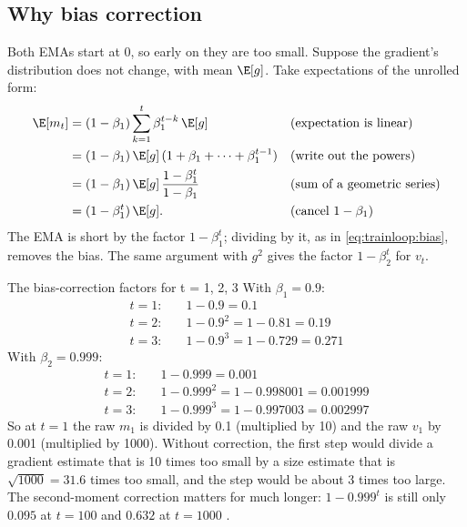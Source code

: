 \subsection{Why bias correction}

Both EMAs start at 0, so early on they are too small. Suppose the gradient's distribution does
not change, with mean $\E[g]$. Take expectations of the unrolled form:
\begin{align*}
\E[m_t] &= (1 - \beta_1)\sum_{k=1}^{t}\beta_1^{t-k}\,\E[g]
  && \text{(expectation is linear)}\\
&= (1 - \beta_1)\,\E[g]\,(1 + \beta_1 + \dots + \beta_1^{t-1})
  && \text{(write out the powers)}\\
&= (1 - \beta_1)\,\E[g]\,\frac{1 - \beta_1^t}{1 - \beta_1}
  && \text{(sum of a geometric series)}\\
&= (1 - \beta_1^t)\,\E[g].
  && \text{(cancel $1 - \beta_1$)}
\end{align*}
The EMA is short by the factor $1 - \beta_1^t$; dividing by it, as in \cref{eq:trainloop:bias},
removes the bias. The same argument with $g^2$ gives the factor $1 - \beta_2^t$ for $v_t$.

\begin{worked}[label={we:trainloop:bias}]{The bias-correction factors for t = 1, 2, 3}
With $\beta_1 = 0.9$:
\begin{align*}
t = 1:&\quad 1 - 0.9 = 0.1\\
t = 2:&\quad 1 - 0.9^2 = 1 - 0.81 = 0.19\\
t = 3:&\quad 1 - 0.9^3 = 1 - 0.729 = 0.271
\end{align*}
With $\beta_2 = 0.999$:
\begin{align*}
t = 1:&\quad 1 - 0.999 = 0.001\\
t = 2:&\quad 1 - 0.999^2 = 1 - 0.998001 = 0.001999\\
t = 3:&\quad 1 - 0.999^3 = 1 - 0.997003 = 0.002997
\end{align*}
So at $t = 1$ the raw $m_1$ is divided by 0.1 (multiplied by 10) and the raw $v_1$ by 0.001
(multiplied by 1000). Without correction, the first step would divide a gradient estimate that
is 10 times too small by a size estimate that is $\sqrt{1000} = 31.6$ times too small, and the
step would be about 3 times too large. The second-moment correction matters for much longer:
$1 - 0.999^{t}$ is still only $0.095$ at $t = 100$ and $0.632$ at $t = 1000$ \tagC.
\end{worked}

